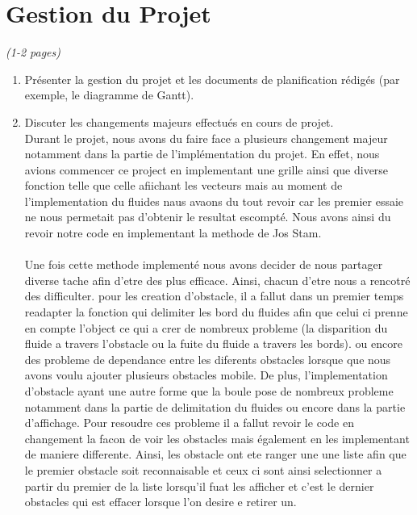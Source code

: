 \documentclass[a4paper]{article}
\begin{document}
\section{Gestion du Projet}
\emph{ (1-2 pages)}
\begin{enumerate}%
\item 	Présenter la gestion du projet et les documents de planification rédigés (par exemple, le diagramme de Gantt).
\item	Discuter les changements majeurs effectués en cours de projet.\\
      Durant le projet, nous avons du faire face a plusieurs changement majeur notamment 
      dans la partie de l'implémentation du projet. En effet, 
      nous avions commencer ce project en implementant une grille ainsi que
      diverse fonction telle que celle afiichant les vecteurs
      mais au moment de l'implementation du fluides naus avaons du tout revoir
      car les premier essaie ne nous permetait pas d'obtenir le resultat escompté. 
      Nous avons ainsi du revoir notre code en implementant la methode de Jos Stam.
      \\
      \\
      Une fois cette methode implementé nous avons decider de nous partager diverse 
      tache afin d'etre des plus efficace. Ainsi, chacun d'etre nous a rencotré des
      difficulter.
      pour les creation d'obstacle, il a fallut dans un premier temps readapter la fonction
      qui delimiter les bord du fluides afin que celui ci prenne en compte l'object
      ce qui a crer de nombreux probleme (la disparition du fluide a travers l'obstacle ou la fuite du fluide a travers les bords).
      ou encore des probleme de dependance entre les diferents obstacles lorsque que nous avons voulu
      ajouter plusieurs obstacles mobile. De plus, l'implementation d'obstacle ayant une autre forme
      que la boule pose de nombreux probleme notamment dans la partie de delimitation du fluides ou encore dans la partie d'affichage.
      Pour resoudre ces probleme il a fallut revoir le code en changement la facon de voir 
      les obstacles mais également en les implementant de maniere differente.
      Ainsi, les obstacle ont ete ranger une une liste afin que le premier obstacle soit reconnaisable
      et ceux ci sont ainsi selectionner a partir du premier de la liste lorsqu'il fuat
      les afficher et c'est le dernier obstacles qui est effacer lorsque l'on desire e retirer un.

\end{enumerate}
\end{document}
